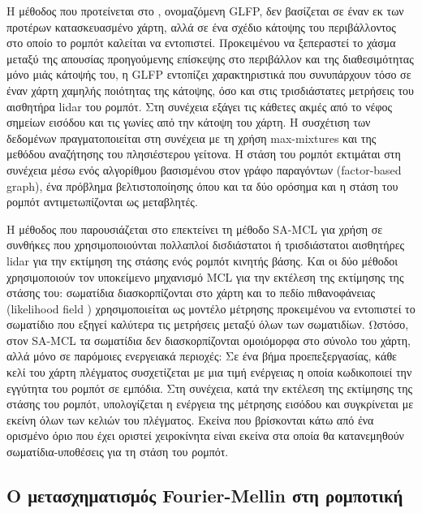 Η μέθοδος που προτείνεται στο \cite{Wang2019a}, ονομαζόμενη GLFP, δεν βασίζεται
σε έναν εκ των προτέρων κατασκευασμένο χάρτη, αλλά σε ένα σχέδιο κάτοψης του
περιβάλλοντος στο οποίο το ρομπότ καλείται να εντοπιστεί. Προκειμένου να
ξεπεραστεί το χάσμα μεταξύ της απουσίας προηγούμενης επίσκεψης στο περιβάλλον
και της διαθεσιμότητας μόνο μιάς κάτοψής του, η GLFP εντοπίζει χαρακτηριστικά
που συνυπάρχουν τόσο σε έναν χάρτη χαμηλής ποιότητας της κάτοψης, όσο και στις
τρισδιάστατες μετρήσεις του αισθητήρα lidar του ρομπότ.  Στη συνέχεια εξάγει
τις κάθετες ακμές από το νέφος σημείων εισόδου και τις γωνίες από την κάτοψη
του χάρτη. Η συσχέτιση των δεδομένων πραγματοποιείται στη συνέχεια με τη χρήση
max-mixtures \cite{Olson2013} και της μεθόδου αναζήτησης του πλησιέστερου
γείτονα.  Η στάση του ρομπότ εκτιμάται στη συνέχεια μέσω ενός αλγορίθμου
βασισμένου στον γράφο παραγόντων (factor-based graph), ένα πρόβλημα
βελτιστοποίησης όπου και τα δύο ορόσημα και η στάση του ρομπότ αντιμετωπίζονται
ως μεταβλητές.

Η μέθοδος που παρουσιάζεται στο \cite{Yilmaz2019} επεκτείνει τη μέθοδο SA-MCL
\cite{Zhang2009} για χρήση σε συνθήκες που χρησιμοποιούνται πολλαπλοί
δισδιάστατοι ή τρισδιάστατοι αισθητήρες lidar για την εκτίμηση της στάσης ενός
ρομπότ κινητής βάσης. Και οι δύο μέθοδοι χρησιμοποιούν τον υποκείμενο μηχανισμό
MCL \cite{Gustafsson2002} για την εκτέλεση της εκτίμησης της στάσης του:
σωματίδια διασκορπίζονται στο χάρτη και το πεδίο πιθανοφάνειας (likelihood
field \cite{thrun2005probabilistic}) χρησιμοποιείται ως μοντέλο μέτρησης
προκειμένου να εντοπιστεί το σωματίδιο που εξηγεί καλύτερα τις μετρήσεις μεταξύ
όλων των σωματιδίων. Ωστόσο, στον SA-MCL τα σωματίδια δεν διασκορπίζονται
ομοιόμορφα στο σύνολο του χάρτη, αλλά μόνο σε παρόμοιες ενεργειακά περιοχές: Σε
ένα βήμα προεπεξεργασίας, κάθε κελί του χάρτη πλέγματος συσχετίζεται με μια
τιμή ενέργειας η οποία κωδικοποιεί την εγγύτητα του ρομπότ σε εμπόδια. Στη
συνέχεια, κατά την εκτέλεση της εκτίμησης της στάσης του ρομπότ, υπολογίζεται η
ενέργεια της μέτρησης εισόδου και συγκρίνεται με εκείνη όλων των κελιών του
πλέγματος.  Εκείνα που βρίσκονται κάτω από ένα ορισμένο όριο που έχει οριστεί
χειροκίνητα είναι εκείνα στα οποία θα κατανεμηθούν σωματίδια-υποθέσεις για τη
στάση του ρομπότ.



\subsection{Ο μετασχηματισμός Fourier-Mellin στη ρομποτική}
\label{subsection:02_03_02:02}

